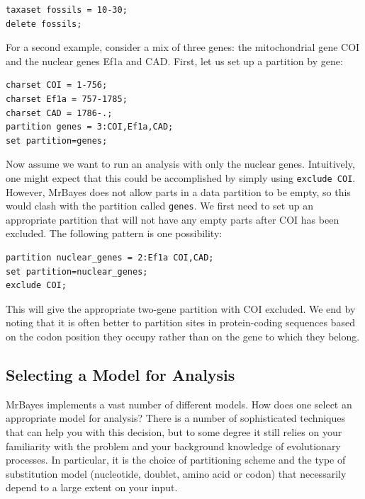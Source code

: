 \documentclass[12pt]{book}
\newcommand{\ttt}[1]{\texttt{#1}}
\begin{document}
\footnotesize
\begin{singlespacing}
\begin{verbatim}
taxaset fossils = 10-30;
delete fossils;
\end{verbatim}
\end{singlespacing}
\normalsize

For a second example, consider a mix of three genes: the mitochondrial gene COI and the nuclear
genes Ef1a and CAD. First, let us set up a partition by gene:

\footnotesize
\begin{singlespacing}
\begin{verbatim}
charset COI = 1-756;
charset Ef1a = 757-1785;
charset CAD = 1786-.;
partition genes = 3:COI,Ef1a,CAD;
set partition=genes;
\end{verbatim}
\end{singlespacing}
\normalsize

Now assume we want to run an analysis with only the nuclear genes. Intuitively, one might expect
that this could be accomplished by simply using \ttt{exclude COI}. However, MrBayes does not allow
parts in a data partition to be empty, so this would clash with the partition called \ttt{genes}.
We first need to set up an appropriate partition that will not have any empty parts after COI has
been excluded. The following pattern is one possibility:

\footnotesize
\begin{singlespacing}
\begin{verbatim}
partition nuclear_genes = 2:Ef1a COI,CAD;
set partition=nuclear_genes;
exclude COI;
\end{verbatim}
\end{singlespacing}
\normalsize

This will give the appropriate two-gene partition with COI excluded. We end by noting that it is
often better to partition sites in protein-coding sequences based on the codon position they occupy
rather than on the gene to which they belong.

\subsection{Selecting a Model for Analysis}

MrBayes implements a vast number of different models. How does one select an appropriate model for
analysis? There is a number of sophisticated techniques that can help you with this decision, but
to some degree it still relies on your familiarity with the problem and your background knowledge
of evolutionary processes. In particular, it is the choice of partitioning scheme and the type of
substitution model (nucleotide, doublet, amino acid or codon) that necessarily depend to a large
extent on your input.
\end{document}
